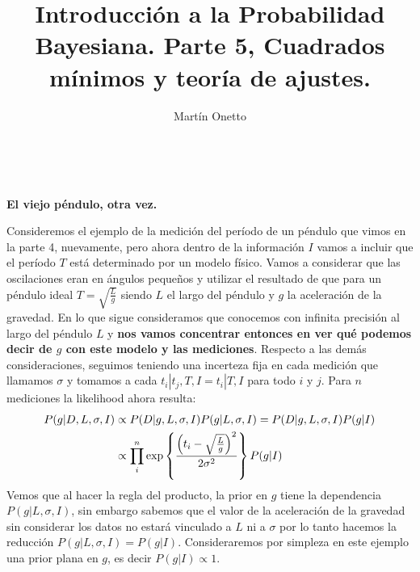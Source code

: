 \documentclass[aps,onecolumn,12pt,notitlepage]{revtex4-1}
\begin{document}
\renewcommand{\andname}{y}
\renewcommand{\tablename}{Tabla}
\renewcommand{\labelenumi}{\Roman{enumi}.}

\title{Introducción a la Probabilidad Bayesiana.  Parte 5, Cuadrados mínimos y teoría de ajustes.}
\author{Martín Onetto} 
\maketitle
\

\textbf{El viejo péndulo, otra vez.}


Consideremos el ejemplo de la medición del período de un péndulo que vimos en la parte 4, nuevamente, pero ahora dentro de la información $I$ vamos a incluir que el período $T$ está determinado por un modelo físico. Vamos a considerar que las oscilaciones eran en ángulos pequeños y utilizar el resultado de que para un péndulo ideal $T = \sqrt{\frac{L}{g}}$ siendo $L$ el largo del péndulo y $g$ la aceleración de la gravedad. En lo que sigue consideramos que conocemos con infinita precisión al largo del péndulo $L$ y \textbf{nos vamos concentrar entonces en ver qué podemos decir de $g$ con este modelo y las mediciones}. Respecto a las demás consideraciones, seguimos teniendo una incerteza fija en cada medición que llamamos $\sigma$ y tomamos a cada $t_{i}|t_{j},T,I = t_{i}|T,I $ para todo $i$ y $j$. Para $n$ mediciones la likelihood ahora resulta:
\begin{equation}
\begin{aligned}
\displaystyle P(g|D,L,\sigma,I) &\propto P(D|g,L,\sigma,I) P(g|L,\sigma,I) = P(D|g,L,\sigma,I) P(g|I)\\
\displaystyle &\propto \prod_{i}^{n} \exp \left\{ \frac{\left(t_{i} - \sqrt{\frac{L}{g}}\right)^2}{2\sigma^2} \right\} P(g|I)
\end{aligned}
\end{equation}
Vemos que al hacer la regla del producto, la prior en $g$ tiene la dependencia $P(g|L,\sigma,I)$, sin embargo sabemos que el valor de la aceleración de la gravedad sin considerar los datos no estará vinculado a $L$ ni a $\sigma$ por lo tanto hacemos la reducción $P(g|L,\sigma,I) = P(g|I)$. Consideraremos por simpleza en este ejemplo una prior plana en $g$, es decir $P(g|I) \propto 1$. 
\end{document}
